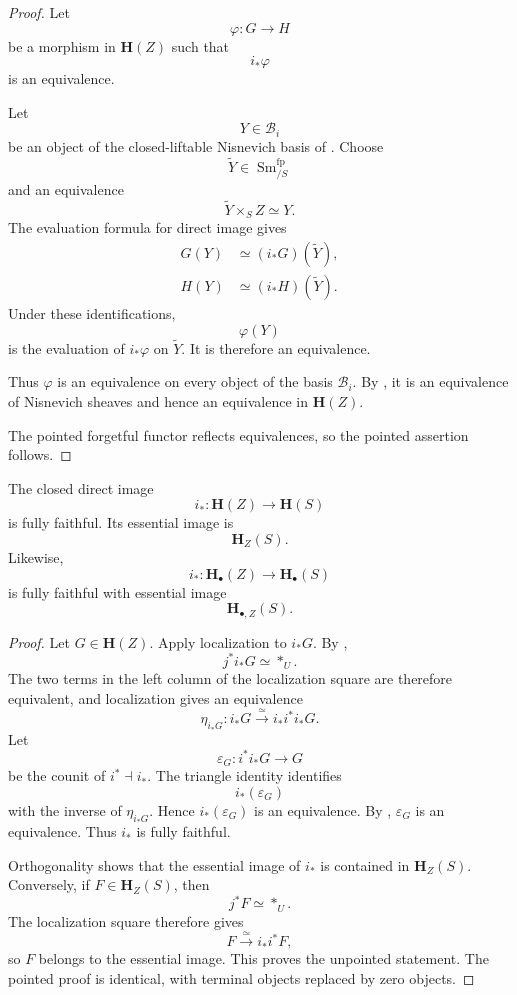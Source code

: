 \begin{proof}
Let
\[
    \varphi
    \colon
    G
    \longrightarrow
    H
\]
be a morphism in \(\mathbf H(Z)\) such that
\[
    i_*\varphi
\]
is an equivalence.

Let
\[
    Y
    \in
    \mathcal B_i
\]
be an object of the closed-liftable Nisnevich basis of
.  Choose
\[
    \widetilde Y
    \in
    \operatorname{Sm}^{\mathrm{fp}}_{/S}
\]
and an equivalence
\[
    \widetilde Y\times_SZ
    \simeq
    Y.
\]
The evaluation formula for direct image gives
\[
\begin{aligned}
    G(Y)
    &\simeq
    (i_*G)(\widetilde Y),
    \\
    H(Y)
    &\simeq
    (i_*H)(\widetilde Y).
\end{aligned}
\]
Under these identifications,
\[
    \varphi(Y)
\]
is the evaluation of \(i_*\varphi\) on \(\widetilde Y\).  It is
therefore an equivalence.

Thus \(\varphi\) is an equivalence on every object of the basis
\(\mathcal B_i\).  By
,
it is an equivalence of Nisnevich sheaves and hence an equivalence in
\(\mathbf H(Z)\).

The pointed forgetful functor reflects equivalences, so the pointed
assertion follows.
\end{proof}

\begin{theorem}
\label{thm:closed-support-kashiwara}
The closed direct image
\[
    i_*
    \colon
    \mathbf H(Z)
    \longrightarrow
    \mathbf H(S)
\]
is fully faithful.  Its essential image is
\[
    \mathbf H_Z(S).
\]
Likewise,
\[
    i_*
    \colon
    \mathbf H_\bullet(Z)
    \longrightarrow
    \mathbf H_\bullet(S)
\]
is fully faithful with essential image
\[
    \mathbf H_{\bullet,Z}(S).
\]
\end{theorem}

\begin{proof}
Let \(G\in\mathbf H(Z)\).  Apply localization to \(i_*G\).  By
,
\[
    j^*i_*G
    \simeq
    *_U.
\]
The two terms in the left column of the localization square are
therefore equivalent, and localization gives an equivalence
\[
    \eta_{i_*G}
    \colon
    i_*G
    \xrightarrow{\simeq}
    i_*i^*i_*G.
\]
Let
\[
    \varepsilon_G
    \colon
    i^*i_*G
    \longrightarrow
    G
\]
be the counit of \(i^*\dashv i_*\).  The triangle identity identifies
\[
    i_*(\varepsilon_G)
\]
with the inverse of \(\eta_{i_*G}\).  Hence
\(i_*(\varepsilon_G)\) is an equivalence.  By
, \(\varepsilon_G\) is an
equivalence.  Thus \(i_*\) is fully faithful.

Orthogonality shows that the essential image of \(i_*\) is contained in
\(\mathbf H_Z(S)\).  Conversely, if \(F\in\mathbf H_Z(S)\), then
\[
    j^*F
    \simeq
    *_U.
\]
The localization square therefore gives
\[
    F
    \xrightarrow{\simeq}
    i_*i^*F,
\]
so \(F\) belongs to the essential image.  This proves the unpointed
statement.  The pointed proof is identical, with terminal objects
replaced by zero objects.
\end{proof}

